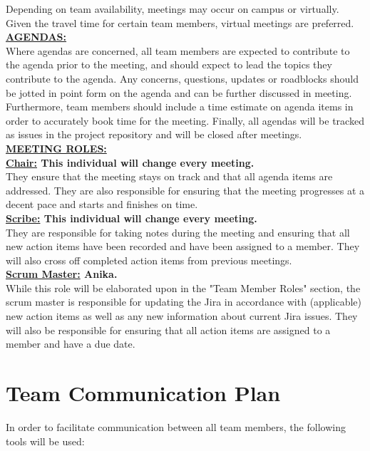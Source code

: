 \documentclass{article}
\begin{document}
Depending on team availability, meetings may occur on campus or virtually. 
Given the travel time for certain team members, virtual meetings are preferred.\\

\noindent \textbf{\underline{AGENDAS:}} \\

Where agendas are concerned, all team members are expected to contribute to the agenda prior to the meeting, and should expect to lead the topics they contribute to the agenda. 
Any concerns, questions, updates or roadblocks should be jotted in point form on the agenda and can be further discussed in meeting. 
Furthermore, team members should include a time estimate on agenda items in order to accurately book time for the meeting.
Finally, all agendas will be tracked as issues in the project repository and will be closed after meetings. \\

\noindent \textbf{\underline{MEETING ROLES:}} \\

\noindent \textbf{\underline{Chair:} This individual will change every meeting. } \\
\noindent They ensure that the meeting stays on track and that all agenda items are addressed. 
They are also responsible for ensuring that the meeting progresses at a decent pace and starts and finishes on time. \\

\noindent \textbf{\underline{Scribe:} This individual will change every meeting.} \\
\noindent They are responsible for taking notes during the meeting and ensuring that all new action items have been recorded and have been assigned to a member.
They will also cross off completed action items from previous meetings.\\

\noindent \textbf{\underline{Scrum Master:} Anika.} \\
\noindent While this role will be elaborated upon in the "Team Member Roles" section, the scrum master is responsible for updating the Jira in accordance with (applicable) new action items as well as any new information about current Jira issues.
They will also be responsible for ensuring that all action items are assigned to a member and have a due date.\\



\section{Team Communication Plan}
In order to facilitate communication between all team members, the following tools will be used:
\end{document}
